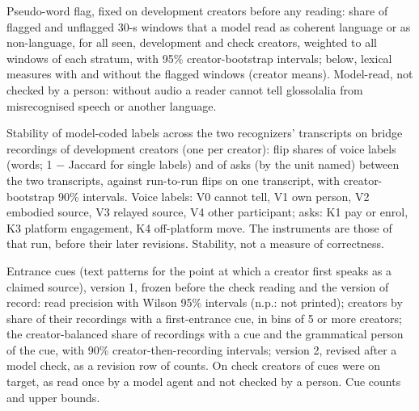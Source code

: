 \begin{table}[ht]
\centering
\small

\caption{Pseudo-word flag, fixed on development creators before any reading: share of flagged and unflagged 30-s windows
that a model read as coherent language or as non-language, for all seen, development and check creators, weighted to all
windows of each stratum, with 95\% creator-bootstrap intervals; below, lexical measures with and without the flagged
windows (creator means). Model-read, not checked by a person: without audio a reader cannot tell glossolalia from
misrecognised speech or another language. \LabelValidity}
\label{tab:nonlanguage}
\end{table}

\begin{table}[ht]
\centering
\small

\caption{Stability of model-coded labels across the two recognizers' transcripts on bridge recordings of development
creators (one per creator): flip shares of voice labels (words; 1 $-$ Jaccard for single labels) and of asks (by the unit
named) between the two transcripts, against run-to-run flips on one transcript, with creator-bootstrap 90\% intervals.
Voice labels: V0 cannot tell, V1 own person, V2 embodied source, V3 relayed source, V4 other participant; asks: K1 pay
or enrol, K3 platform engagement, K4 off-platform move. The instruments are those of that run, before their later
revisions. Stability, not a measure of correctness. \LabelValidity}
\label{tab:labelflips}
\end{table}

\begin{table}[ht]
\centering
\small

\caption{Entrance cues (text patterns for the point at which a creator first speaks as a claimed source), version 1, frozen before the
check reading and the version of record: read precision with Wilson 95\% intervals (n.p.: not printed); creators by
share of their recordings with a first-entrance cue, in bins of 5 or more creators; the creator-balanced share of
recordings with a cue and the grammatical person of the cue, with 90\% creator-then-recording intervals; version 2,
revised after a model check, as a revision row of counts. On check creators \EntryReadOn{} of \EntryRead{} cues were on
target, as read once by a model agent and not checked by a person. Cue counts and upper bounds. \LabelValidity}
\label{tab:entry}
\end{table}
